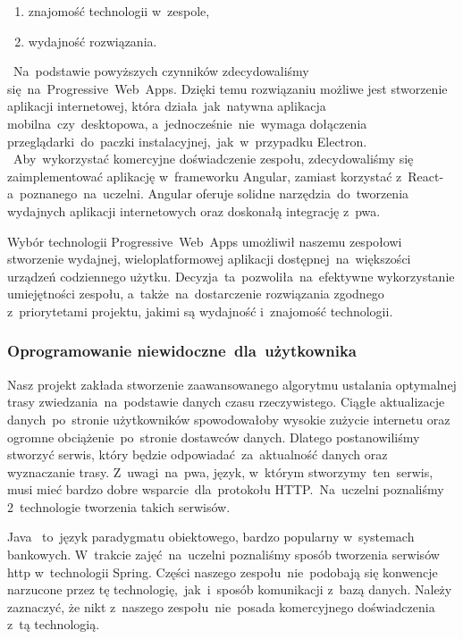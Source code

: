 \begin{enumerate}
    \item znajomość technologii w~zespole,
    \item wydajność rozwiązania.
\end{enumerate}
\indent ~Na~podstawie powyższych czynników zdecydowaliśmy się~na~Progressive~Web~Apps.
Dzięki temu rozwiązaniu możliwe jest stworzenie aplikacji internetowej, która działa~jak~natywna aplikacja mobilna~czy~desktopowa, a~jednocześnie~nie~wymaga dołączenia przeglądarki~do~paczki instalacyjnej,~jak~w~przypadku Electron.
~Aby~wykorzystać komercyjne doświadczenie zespołu, zdecydowaliśmy się zaimplementować aplikację w~frameworku Angular, zamiast korzystać z~React-a~poznanego~na~uczelni.
Angular oferuje solidne narzędzia~do~tworzenia wydajnych aplikacji internetowych oraz doskonałą integrację z~\acrshort{pwa}.

\indent Wybór technologii Progressive~Web~Apps umożliwił naszemu zespołowi stworzenie wydajnej, wieloplatformowej aplikacji dostępnej~na~większości urządzeń codziennego użytku.
Decyzja~ta~pozwoliła~na~efektywne wykorzystanie umiejętności zespołu, a~także~na~dostarczenie rozwiązania zgodnego z~priorytetami projektu, jakimi są wydajność i~znajomość technologii.

\subsubsection{Oprogramowanie niewidoczne~dla~użytkownika}
\indent Nasz projekt zakłada stworzenie zaawansowanego algorytmu ustalania optymalnej trasy zwiedzania~na~podstawie danych czasu rzeczywistego.
Ciągłe aktualizacje danych~po~stronie użytkowników spowodowałoby wysokie zużycie internetu oraz ogromne obciążenie~po~stronie dostawców danych.
Dlatego postanowiliśmy stworzyć serwis, który będzie odpowiadać~za~aktualność danych oraz wyznaczanie trasy.
Z~uwagi~na~\acrshort{pwa}, język, w~którym stworzymy~ten~serwis, musi mieć bardzo dobre wsparcie~dla~protokołu HTTP\@.~Na~uczelni poznaliśmy 2~technologie tworzenia takich serwisów.

\indent Java ~to~język paradygmatu obiektowego, bardzo popularny w~systemach bankowych.
W~trakcie zajęć~na~uczelni poznaliśmy sposób tworzenia serwisów \acrshort{http} w~technologii Spring.
Części naszego zespołu~nie~podobają się konwencje narzucone przez tę technologię,~jak~i~sposób komunikacji z~bazą danych.
Należy zaznaczyć, że nikt z~naszego zespołu~nie~posada komercyjnego doświadczenia z~tą technologią.


